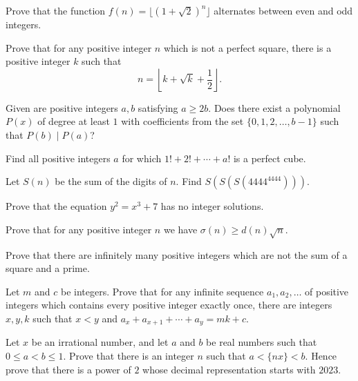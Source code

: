 \begin{problem}{\label{p:n:n:pr:15}}
  Prove that the function $f(n)=\lfloor(1+\sqrt 2)^n\rfloor$ alternates
    between even and odd integers.
\end{problem}
\begin{problem}{\label{p:n:n:pr:16}}
  Prove that for any positive integer $n$ which is not a perfect square,
    there is a positive integer $k$ such that
    \[n=\left\lfloor k+\sqrt k+\frac12\right\rfloor.\]
\end{problem}
\begin{problem}{\label{p:n:n:pr:17}}
   Given are positive integers $a, b$ satisfying $a \geq 2b$. Does there
    exist a polynomial $P(x)$ of degree at least $1$ with coefficients from the
    set $\{0, 1, 2, \ldots, b-1 \}$ such that $P(b) \mid P(a)$?
\end{problem}
\begin{problem}{\label{p:n:n:pr:18}}
  Find all positive integers $a$ for which $1!+2!+\cdots+a!$ is a perfect
    cube.
\end{problem}
\begin{problem}{\label{p:n:n:pr:19}}
  Let $S(n)$ be the sum of the digits of $n$. Find $S(S(S(4444^{4444})))$.
\end{problem}
\begin{problem}{\label{p:n:n:pr:20}}
  Prove that the equation $y^2=x^3+7$ has no integer solutions.
\end{problem}
\begin{problem}{\label{p:n:n:pr:21}}
  Prove that for any positive integer $n$ we have $\sigma(n)\ge d(n)\sqrt n$.
\end{problem}
\begin{problem}{\label{p:n:n:pr:22}}
  Prove that there are infinitely many positive integers which are not the
    sum of a square and a prime.
\end{problem}
\begin{problem}{\label{p:n:n:pr:23}}
  Let $m$ and $c$ be integers.
    Prove that for any infinite sequence $a_1,a_2,\ldots$ of positive integers which
    contains every positive integer exactly once, there
    are integers $x,y,k$ such that $x<y$ and $a_x+a_{x+1}+\cdots+a_y=mk+c$.
\end{problem}
\begin{problem}{\label{p:n:n:pr:24}}
  Let $x$ be an irrational number, and let $a$ and $b$ be real numbers
    such that $0\le a<b\le 1$. Prove that there is an integer $n$ such that
    $a<\{nx\}<b$. Hence prove that there is a power of $2$ whose decimal
    representation starts with $2023$.
\end{problem}
